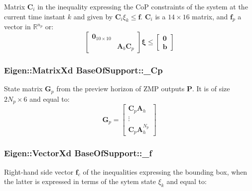 \-Matrix $\mathbf{C}_i$ in the inequality expressing the \-Co\-P constraints of the system at the current time instant $k$ and given by $\mathbf{C}_i \xi_k \leq \mathbf{f}$. $\mathbf{C}_i$ is a $14 \times 16$ matrix, and $\mathbf{f}_p$ a vector in $\mathbb{R}^{n_p}$ or\-: \[ \left[\begin{array}{cc} \mathbf{0}_{10\times10} & \\ & \mathbf{A}_b \mathbf{C}_p \end{array}\right] \mathbf{\xi} \leq \left[\begin{array}{c} \mathbf{0} \\ \mathbf{b} \end{array}\right] \] \hypertarget{classBaseOfSupport_a0ff0fd44966f86d5a62e4d38c3cfea60}{
\subsubsection[{\-\_\-\-Cp}]{\setlength{\rightskip}{0pt plus 5cm}\-Eigen\-::\-Matrix\-Xd {\bf \-Base\-Of\-Support\-::\-\_\-\-Cp}}}\label{classBaseOfSupport_a0ff0fd44966f86d5a62e4d38c3cfea60}
\-State matrix $\mathbf{G}_p$ from the preview horizon of \-Z\-M\-P outputs $\mathbf{P}$. \-It is of size $2N_p \times 6$ and equal to\-: \[ \mathbf{G}_p = \left[\begin{array}{c} \mathbf{C}_p\mathbf{A}_h \\ \vdots \\ \mathbf{C}_p\mathbf{A}^{N_p}_h \end{array}\right] \] \hypertarget{classBaseOfSupport_aa2d0af7272d153ead5e088ff67c981e8}{
\subsubsection[{\-\_\-f}]{\setlength{\rightskip}{0pt plus 5cm}\-Eigen\-::\-Vector\-Xd {\bf \-Base\-Of\-Support\-::\-\_\-f}}}\label{classBaseOfSupport_aa2d0af7272d153ead5e088ff67c981e8}
\-Right-\/hand side vector $\mathbf{f}_c$ of the inequalities expressing the bounding box, when the latter is expressed in terms of the sytem state $\xi_k$ and equal to\-:

